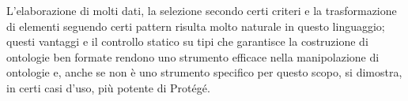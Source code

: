 L'elaborazione di molti dati, la selezione secondo certi criteri e la trasformazione di elementi seguendo certi pattern risulta molto naturale in questo linguaggio; questi vantaggi e il controllo statico su tipi che garantisce la costruzione di ontologie ben formate rendono \cduce uno strumento efficace nella manipolazione di ontologie e, anche se non è uno strumento specifico per questo scopo, si dimostra, in certi casi d'uso, più potente di Protégé. 